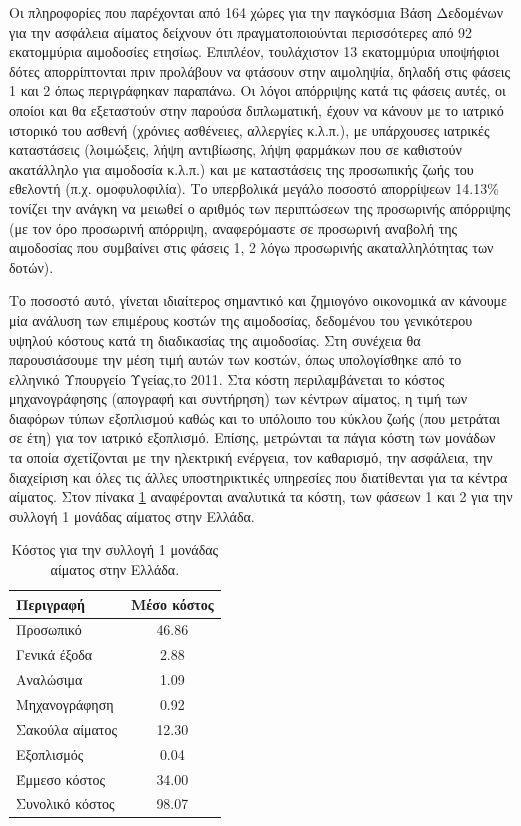 		Οι πληροφορίες που παρέχονται από 164 χώρες για την παγκόσμια Βάση Δεδομένων για την ασφάλεια αίματος δείχνουν ότι πραγματοποιούνται περισσότερες από 92 εκατομμύρια αιμοδοσίες ετησίως\cite{WorldHealth}. Επιπλέον, τουλάχιστον 13 εκατομμύρια υποψήφιοι δότες απορρίπτονται πριν προλάβουν να φτάσουν στην αιμοληψία, δηλαδή στις φάσεις 1 και 2 όπως περιγράφηκαν παραπάνω\cite{safety}. Οι λόγοι απόρριψης κατά τις φάσεις αυτές, οι οποίοι και θα εξεταστούν στην παρούσα διπλωματική, έχουν να κάνουν με το ιατρικό ιστορικό του ασθενή (χρόνιες ασθένειες, αλλεργίες κ.λ.π.), με υπάρχουσες ιατρικές καταστάσεις (λοιμώξεις, λήψη αντιβίωσης, λήψη φαρμάκων που σε καθιστούν ακατάλληλο για  αιμοδοσία κ.λ.π.) και με καταστάσεις της προσωπικής ζωής του εθελοντή (π.χ. ομοφυλοφιλία). Το υπερβολικά μεγάλο ποσοστό απορρίψεων 14.13\% τονίζει την ανάγκη να μειωθεί ο αριθμός των περιπτώσεων της προσωρινής απόρριψης (με τον όρο προσωρινή απόρριψη, αναφερόμαστε σε προσωρινή αναβολή της αιμοδοσίας που συμβαίνει στις φάσεις 1, 2 λόγω προσωρινής ακαταλληλότητας των δοτών).

		Το ποσοστό αυτό, γίνεται ιδιαίτερος σημαντικό και ζημιογόνο οικονομικά αν κάνουμε μία ανάλυση των επιμέρους κοστών της αιμοδοσίας, δεδομένου του γενικότερου υψηλού κόστους κατά τη διαδικασίας της αιμοδοσίας. Στη συνέχεια θα παρουσιάσουμε την μέση τιμή αυτών των κοστών, όπως υπολογίσθηκε από το ελληνικό Υπουργείο Υγείας,το 2011\cite{Fragoulakis}. Στα κόστη περιλαμβάνεται το κόστος μηχανογράφησης (απογραφή και συντήρηση) των κέντρων αίματος, η τιμή των διαφόρων τύπων εξοπλισμού καθώς και το υπόλοιπο του κύκλου ζωής (που μετράται σε έτη) για τον ιατρικό εξοπλισμό. Επίσης, μετρώνται τα πάγια κόστη των μονάδων τα οποία σχετίζονται με την ηλεκτρική ενέργεια,  τον καθαρισμό, την ασφάλεια, την διαχείριση και όλες τις άλλες υποστηρικτικές υπηρεσίες που διατίθενται για τα κέντρα αίματος. Στον πίνακα \ref{tab:blood_collection_cost_greece} αναφέρονται αναλυτικά τα κόστη, των φάσεων 1 και 2 για την συλλογή 1 μονάδας αίματος στην Ελλάδα.
		
	\begin{table}[h]
		\centering
		\begin{tabular}{|l|c|}
		    \hline
		    \rowcolor{grayy}
		    \textbf{Περιγραφή} & \textbf{Μέσο κόστος}
		    \\ \hline
		     Προσωπικό & 46.86
		     \\ 
		     Γενικά έξοδα & 2.88
		     \\ 
		     Αναλώσιμα & 1.09
		     \\ 
		     Μηχανογράφηση & 0.92
		     \\
		     Σακούλα αίματος & 12.30
		     \\
		     Εξοπλισμός & 0.04
		     \\ 
		     Έμμεσο κόστος & 34.00
		     \\ \hline
		     Συνολικό κόστος & 98.07	
		     \\ \hline
		\end{tabular}
		\caption{Κόστος για την συλλογή 1 μονάδας αίματος στην Ελλάδα.}
		\label{tab:blood_collection_cost_greece}
	\end{table}
		
